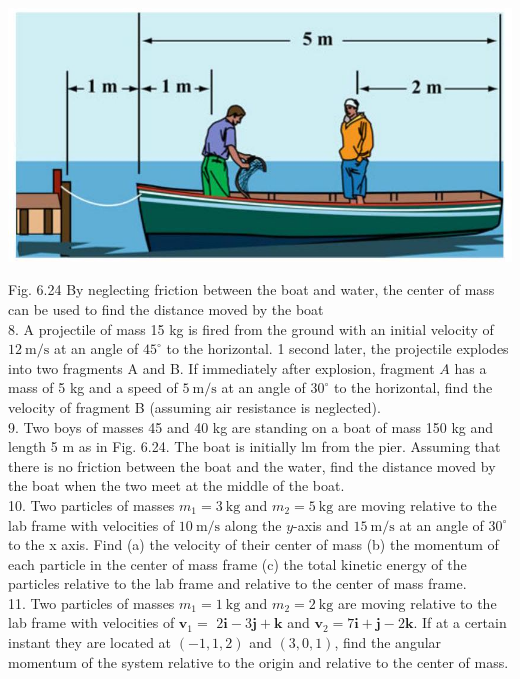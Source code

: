 \documentclass[10pt]{article}
\begin{document}
\begin{center}
\includegraphics[max width=\textwidth]{2024_09_13_db1f357d2aad0a03eb2eg-109(2)}
\end{center}

Fig. 6.24 By neglecting friction between the boat and water, the center of mass can be used to find the distance moved by the boat\\
8. A projectile of mass 15 kg is fired from the ground with an initial velocity of $12 \mathrm{~m} / \mathrm{s}$ at an angle of $45^{\circ}$ to the horizontal. 1 second later, the projectile explodes into two fragments A and B. If immediately after explosion, fragment $A$ has a mass of 5 kg and a speed of $5 \mathrm{~m} / \mathrm{s}$ at an angle of $30^{\circ}$ to the horizontal, find the velocity of fragment B (assuming air resistance is neglected).\\
9. Two boys of masses 45 and 40 kg are standing on a boat of mass 150 kg and length 5 m as in Fig. 6.24. The boat is initially lm from the pier. Assuming that there is no friction between the boat and the water, find the distance moved by the boat when the two meet at the middle of the boat.\\
10. Two particles of masses $m_{1}=3 \mathrm{~kg}$ and $m_{2}=5 \mathrm{~kg}$ are moving relative to the lab frame with velocities of $10 \mathrm{~m} / \mathrm{s}$ along the $y$-axis and $15 \mathrm{~m} / \mathrm{s}$ at an angle of $30^{\circ}$ to the x axis. Find (a) the velocity of their center of mass (b) the momentum of each particle in the center of mass frame (c) the total kinetic energy of the particles relative to the lab frame and relative to the center of mass frame.\\
11. Two particles of masses $m_{1}=1 \mathrm{~kg}$ and $m_{2}=2 \mathrm{~kg}$ are moving relative to the lab frame with velocities of $\mathbf{v}_{1}=$ $2 \mathbf{i}-3 \mathbf{j}+\mathbf{k}$ and $\mathbf{v}_{2}=7 \mathbf{i}+\mathbf{j}-2 \mathbf{k}$. If at a certain instant they are located at $(-1,1,2)$ and $(3,0,1)$, find the angular momentum of the system relative to the origin and relative to the center of mass.
\end{document}
